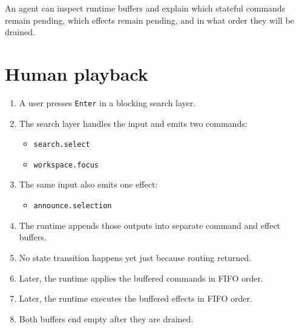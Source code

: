 An agent can inspect runtime buffers and explain which stateful commands remain pending, which effects remain pending, and in what order they will be drained.

\section{Human playback}\label{record-153-human-playback}

\begin{enumerate}
\def\labelenumi{\arabic{enumi}.}
\tightlist
\item
  A user presses \texttt{E\allowbreak{}n\allowbreak{}t\allowbreak{}e\allowbreak{}r} in a blocking search layer.
\item
  The search layer handles the input and emits two commands:

  \begin{itemize}
  \tightlist
  \item
    \texttt{s\allowbreak{}e\allowbreak{}a\allowbreak{}r\allowbreak{}c\allowbreak{}h\allowbreak{}.\allowbreak{}s\allowbreak{}e\allowbreak{}l\allowbreak{}e\allowbreak{}c\allowbreak{}t}
  \item
    \texttt{w\allowbreak{}o\allowbreak{}r\allowbreak{}k\allowbreak{}s\allowbreak{}p\allowbreak{}a\allowbreak{}c\allowbreak{}e\allowbreak{}.\allowbreak{}f\allowbreak{}o\allowbreak{}c\allowbreak{}u\allowbreak{}s}
  \end{itemize}
\item
  The same input also emits one effect:

  \begin{itemize}
  \tightlist
  \item
    \texttt{a\allowbreak{}n\allowbreak{}n\allowbreak{}o\allowbreak{}u\allowbreak{}n\allowbreak{}c\allowbreak{}e\allowbreak{}.\allowbreak{}s\allowbreak{}e\allowbreak{}l\allowbreak{}e\allowbreak{}c\allowbreak{}t\allowbreak{}i\allowbreak{}o\allowbreak{}n}
  \end{itemize}
\item
  The runtime appends those outputs into separate command and effect buffers.
\item
  No state transition happens yet just because routing returned.
\item
  Later, the runtime applies the buffered commands in FIFO order.
\item
  Later, the runtime executes the buffered effects in FIFO order.
\item
  Both buffers end empty after they are drained.
\end{enumerate}

